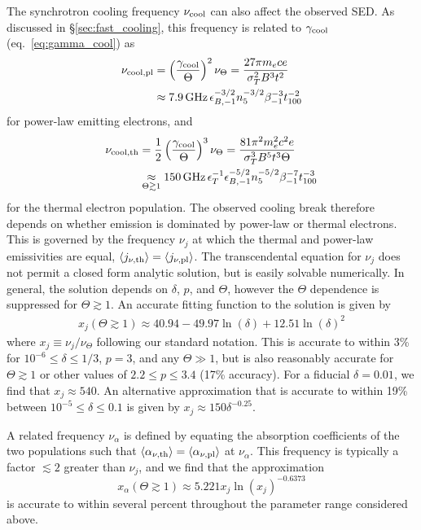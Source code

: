 \documentclass[twocolumn]{aastex63}
\begin{document}
The synchrotron cooling frequency $\nu_{\rm cool}$ can also affect the observed SED. As discussed in \S\ref{sec:fast_cooling}, this frequency is 
related to $\gamma_{\rm cool}$ (eq.~\ref{eq:gamma_cool}) as
\begin{align}
\label{eq:nu_cool_pl}
    \nu_{\rm cool, pl} 
    &= \left(\frac{\gamma_{\rm cool}}{\Theta}\right)^2 \nu_\Theta
    = \frac{27 \pi m_e c e}{\sigma_T^2 B^3 t^2}
    \\ \nonumber
    &\approx 7.9\,{\rm GHz}\, \epsilon_{B,-1}^{-3/2} n_5^{-3/2} \beta_{-1}^{-3} t_{100}^{-2}
\end{align}
for power-law emitting electrons, and
\begin{align}
\label{eq:nu_cool_th}
    \nu_{\rm cool,th}
    &= 
    \frac{1}{2} \left(\frac{\gamma_{\rm cool}}{\Theta}\right)^3 \nu_\Theta
    = \frac{81 \pi^2 m_e^2 c^2 e}{\sigma_T^3 B^5 t^3 \Theta}
    \\ \nonumber
    &\underset{\Theta \gtrsim 1}{\approx} 150\,{\rm GHz}\, \epsilon_T^{-1} \epsilon_{B,-1}^{-5/2} n_5^{-5/2} \beta_{-1}^{-7} t_{100}^{-3}
\end{align}
for the thermal electron population.
The observed cooling break therefore depends on whether emission is dominated by power-law or thermal electrons.
This is governed by the frequency $\nu_j$ at which the thermal and power-law emissivities are equal, $\langle j_{\nu,{\rm th}} \rangle = \langle j_{\nu,{\rm pl}} \rangle$.
The transcendental equation for $\nu_j$ does not permit a closed form analytic solution, but is easily solvable numerically. 
In general, the solution depends on $\delta$, $p$, and $\Theta$, however the $\Theta$ dependence is suppressed for $\Theta \gtrsim 1$.
An accurate fitting function to the solution is given by
\begin{align}
\label{eq:xj}
    x_j(\Theta \gtrsim 1) \approx 40.94 - 49.97 \ln\left(\delta\right)
    + 12.51 \ln\left(\delta\right)^2
\end{align}
where $x_j \equiv \nu_j / \nu_\Theta$ following our standard notation.
This is accurate to within 3\% for $10^{-6} \leq \delta \leq 1/3$, $p=3$, and any $\Theta \gg 1$, but is also reasonably accurate for $\Theta \gtrsim 1$ or other values of $2.2 \leq p \leq 3.4$ (17\% accuracy).
For a fiducial $\delta = 0.01$, we find that $x_j \approx 540$.
An alternative approximation that is accurate to within 19\% between $10^{-5} \leq \delta \leq 0.1$ is given by $x_j \approx 150 \delta^{-0.25}$.

A related frequency $\nu_\alpha$ is defined by equating the absorption coefficients of the two populations such that $\langle \alpha_{\nu,{\rm th}} \rangle = \langle \alpha_{\nu,{\rm pl}} \rangle$ at $\nu_\alpha$.
This frequency is typically a factor $\lesssim 2$ greater than $\nu_j$, and we find that the approximation
\begin{equation}
\label{eq:x_alpha}
    x_\alpha(\Theta \gtrsim 1) \approx 5.221 x_j \ln\left(x_j\right)^{-0.6373}
\end{equation}
is accurate to within several percent throughout the parameter range considered above.
\end{document}
